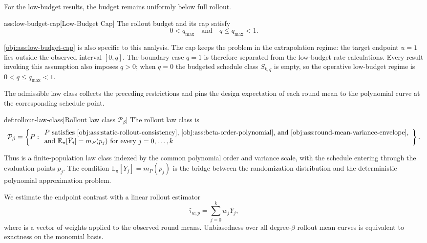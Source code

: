 \documentclass[11pt]{article}
\begin{document}
For the low-budget results, the budget remains uniformly below full rollout.

\begin{assumptionv}{ass:low-budget-cap}[Low-Budget Cap]
The rollout budget and its cap satisfy
\[
0<q_{\max}\quad\text{and}\quad q\le q_{\max}<1.
\]
\end{assumptionv}

\cref{obj:ass:low-budget-cap} is also specific to this analysis. The cap  keeps the problem in the extrapolation regime: the target endpoint \(u=1\) lies outside the observed interval \([0,q]\). The boundary case \(q=1\) is therefore separated from the low-budget rate calculations. Every result invoking this assumption also imposes \(q>0\); when \(q=0\) the budgeted schedule class \(S_{k,q}\) is empty, so the operative low-budget regime is \(0<q\le q_{\max}<1\).

The admissible law class collects the preceding restrictions and pins the design expectation of each round mean to the polynomial curve at the corresponding schedule point.

\begin{definitionv}{def:rollout-law-class}[Rollout law class \(\mathcal P_\beta\)]
The rollout law class is
\[
\mathcal P_\beta
=
\left\{
P:
\begin{array}{l}
P \text{ satisfies \cref{obj:ass:static-rollout-consistency}, \cref{obj:ass:beta-order-polynomial}, and \cref{obj:ass:round-mean-variance-envelope}},\\
\text{and } \mathbb E_\pi[\bar Y_j]=m_P(p_j) \text{ for every } j=0,\ldots,k
\end{array}
\right\}.
\]
\end{definitionv}

Thus  is a finite-population law class indexed by the common polynomial order and variance scale, with the schedule entering through the evaluation points \(p_j\). The condition \(\mathbb E_\pi[\bar Y_j]=m_P(p_j)\) is the bridge between the randomization distribution and the deterministic polynomial approximation problem.

We estimate the endpoint contrast with a linear rollout estimator
\[
\hat\tau_{w,p}=\sum_{j=0}^k w_j\bar Y_j,
\]
where  is a vector of weights applied to the observed round means. Unbiasedness over all degree-\(\beta\) rollout mean curves is equivalent to exactness on the monomial basis.
\end{document}
